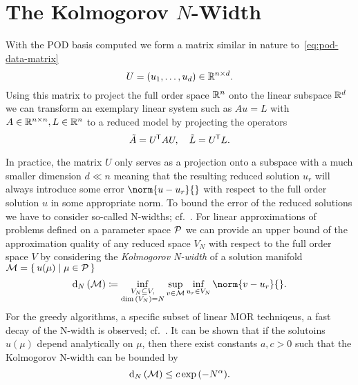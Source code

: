 \section[The Kolmogorov N-Width]{The Kolmogorov {$N$}-Width}\label{sec:kolmogorov-n-width}

With the POD basis computed we form a matrix similar in nature to~\eqref{eq:pod-data-matrix}
\begin{equation*}
    U = \left( u_1, \dots, u_d \right) \in \mathbb{R}^{n \times d}.
\end{equation*}
Using this matrix to project the full order space $\mathbb{R}^n$ onto the linear subspace $\mathbb{R}^d$ we can transform an exemplary linear system such as $A u = L$ with $A \in \mathbb{R}^{n \times n}, L \in \mathbb{R}^n$ to a reduced model by projecting the operators
\begin{equation*}
    \tilde{A} = U^{\mkern-1.5mu \mathsf{T}} A U,\quad \tilde{L} = U^{\mkern-1.5mu \mathsf{T}} L.
\end{equation*}

In practice, the matrix $U$ only serves as a projection onto a subspace with a much smaller dimension $d \ll n$ meaning that the resulting reduced solution $u_r$ will always introduce some error $\norm{u - u_r}{}$ with respect to the full order solution $u$ in some appropriate norm.
To bound the error of the reduced solutions we have to consider so-called N-widths; cf.~\cite{Pinkus1985}.
For linear approximations of problems defined on a parameter space $\mathcal{P}$ we can provide an upper bound of the approximation quality of any reduced space $V_N$ with respect to the full order space $V$ by considering the \emph{Kolmogorov N-width} of a solution manifold $\mathcal{M} = \left\{\,u(\mu)\mid\mu \in \mathcal{P}\,\right\}$
\begin{equation}
    \kolm{\mcl{M}} \coloneqq \inf\limits_{\substack{V_N \subseteq V,\\\dim{(V_N)} = N}} \sup\limits_{v \in \mcl{M}} \inf\limits_{u_r \in V_N} \norm{v - u_r}{}.
\end{equation}
For the greedy algorithms, a specific subset of linear MOR techniqeus, a fast decay of the N-width is observed; cf.~\cite{Binev2011, DeVore2013}.
It can be shown that if the solutoins $u(\mu)$ depend analytically on $\mu$, then there exist constants $a, c > 0$ such that the Kolmogorov N-width can be bounded by
\begin{equation*}
    \mathop{}\!\mathrm{d}_N\left(\mathcal{M}\right) \leq c \exp{(-N^\alpha)}.
\end{equation*}
